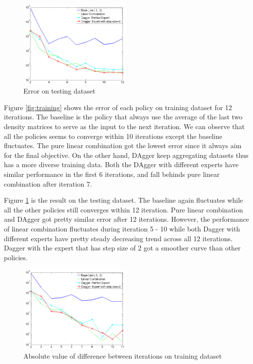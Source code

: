 \documentclass[twoside]{article}
\begin{document}
\begin{figure}[h!]

  \caption{Error on testing dataset}
  \label{fig:testing}
    \includegraphics[width=210px]{Dagger_beta05_testing.jpg}
\end{figure}

Figure \ref{fig:training} shows the error of each policy on training dataset for 12 iterations. The baseline is the policy that always use the average of the last two density matrices to serve as the input to the next iteration.  We can observe that all the policies seems to  converge within 10 iterations except the baseline fluctuates. The pure linear combination got the lowest error since it always aim for the final objective. On the other hand, DAgger keep aggregating datasets thus has a more diverse training data. Both the DAgger with different experts have similar performance in the first 6 iterations, and fall behinds pure linear combination after iteration 7. 

Figure \ref{fig:testing} is the result  on the testing dataset.
The baseline again fluctuates while all the other policies still converges within 12 iteration. 
Pure linear combination and DAgger got pretty similar error after 12 iterations. However, the performance of linear combination fluctuates during iteration 5 - 10 while both Dagger with different experts have pretty steady decreasing trend across all 12 iterations. Dagger with the expert that has step size of 2 got a smoother curve than other policies.


\begin{figure}[h!]
  \caption{Absolute value of difference between iterations on training dataset}
	\label{fig:converge_training}
    \includegraphics[width=210px]{convergence_Training.jpg}
\end{figure}
\end{document}
